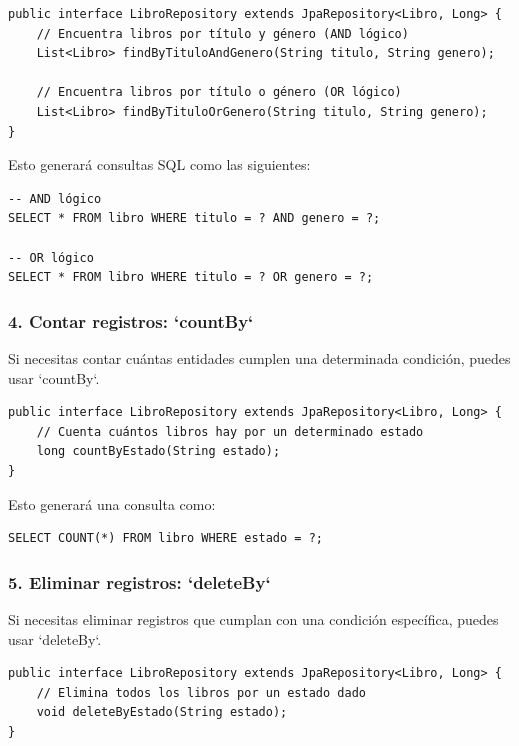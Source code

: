 \documentclass[11pt]{article}
\begin{document}
\begin{verbatim}
public interface LibroRepository extends JpaRepository<Libro, Long> {
    // Encuentra libros por título y género (AND lógico)
    List<Libro> findByTituloAndGenero(String titulo, String genero);

    // Encuentra libros por título o género (OR lógico)
    List<Libro> findByTituloOrGenero(String titulo, String genero);
}
\end{verbatim}

Esto generará consultas SQL como las siguientes:

\begin{verbatim}
-- AND lógico
SELECT * FROM libro WHERE titulo = ? AND genero = ?;

-- OR lógico
SELECT * FROM libro WHERE titulo = ? OR genero = ?;
\end{verbatim}

\subsubsection{4. Contar registros: `countBy`}
\label{sec:orgc974c9c}
Si necesitas contar cuántas entidades cumplen una determinada condición, puedes usar `countBy`.

\begin{verbatim}
public interface LibroRepository extends JpaRepository<Libro, Long> {
    // Cuenta cuántos libros hay por un determinado estado
    long countByEstado(String estado);
}
\end{verbatim}

Esto generará una consulta como:

\begin{verbatim}
SELECT COUNT(*) FROM libro WHERE estado = ?;
\end{verbatim}

\subsubsection{5. Eliminar registros: `deleteBy`}
\label{sec:orgd4197ed}
Si necesitas eliminar registros que cumplan con una condición específica, puedes usar `deleteBy`.

\begin{verbatim}
public interface LibroRepository extends JpaRepository<Libro, Long> {
    // Elimina todos los libros por un estado dado
    void deleteByEstado(String estado);
}
\end{verbatim}
\end{document}
